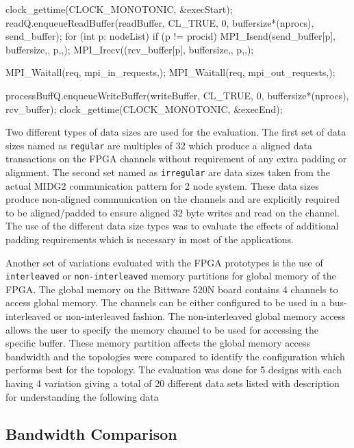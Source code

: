\begin{CppCode}[caption=Pseudo-code to perform MPI+PCIe based data communication
    between FPGAs, frame=tlrb, label=code:mpi_proto]
clock_gettime(CLOCK_MONOTONIC, &execStart);
readQ.enqueueReadBuffer(readBuffer, CL_TRUE, 0, buffersize*(nprocs), send_buffer);
for (int p: nodeList)
{
    if (p != procid)
    {
        MPI_Isend(send_buffer[p], buffersize,, p,,);
        MPI_Irecv((rcv_buffer[p], buffersize,, p,,);
    }
}

MPI_Waitall(req, mpi_in_requests,);
MPI_Waitall(req, mpi_out_requests,);

processBuffQ.enqueueWriteBuffer(writeBuffer, CL_TRUE, 0, buffersize*(nprocs), rcv_buffer);
clock_gettime(CLOCK_MONOTONIC, &execEnd);
\end{CppCode}

Two different types of data sizes are used for the evaluation. The first set of data
sizes named as \texttt{regular} are multiples of 32 which produce a aligned data transactions
on the FPGA channels without requirement of any extra padding or alignment.
The second set named as \texttt{irregular} are data sizes taken from the actual
MIDG2 communication pattern for 2 node system. These data sizes produce
non-aligned communication on the channels and are explicitly required to be
aligned/padded to ensure aligned 32 byte writes and read on the channel.
The use of the different data size types was to evaluate the effects of additional
padding requirements which is necessary in most of the applications.

Another set of variations evaluated with the FPGA prototypes is the use of
\texttt{interleaved} or \texttt{non-interleaved} memory partitions for global memory of the FPGA.
The global memory on the Bittware 520N board
contains 4 channels to access global memory. The channels can be
either configured to be used in a bus-interleaved or non-interleaved fashion.
The non-interleaved global memory access allows the user to specify the
memory channel to be used for accessing the specific buffer. These
memory partition affects the global memory access bandwidth and
the topologies were compared to identify the configuration which performs
best for the topology. The evaluation was done for 5 designs with each
having 4 variation giving a total of 20 different data sets listed with
description for understanding the following data

\subsection{Bandwidth Comparison}

